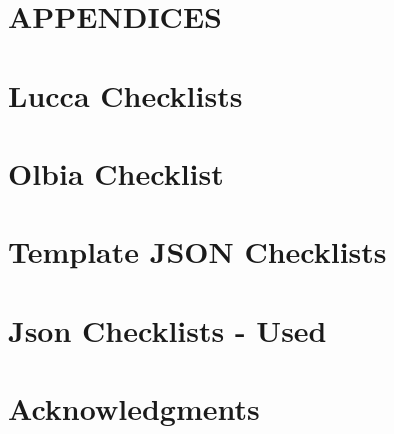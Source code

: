 \chapter*{APPENDICES} 


\appendix
\chapter{Lucca Checklists}


\chapter{Olbia Checklist}



\chapter{Template JSON Checklists}
\label{appendix:json_template}



\chapter{Json Checklists - Used}


%



\chapter{Acknowledgments}


%


